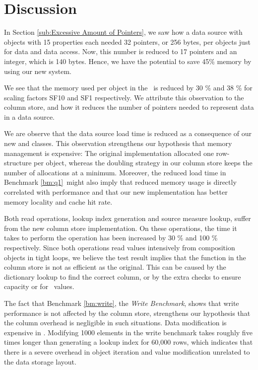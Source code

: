 \section{Discussion}
\label{sec:Discussion}
In Section \ref{sub:Excessive Amount of Pointers}, we saw how a data source with objects with 15 properties each needed 32 pointers, or 256 bytes, per objects just for data and data access. Now, this number is reduced to 17 pointers and an integer, which is 140 bytes. Hence, we have the potential to save 45\% memory by using our new system.

We see that the memory used per object in the \tpchdl~is reduced by 30 \% and 38 \% for scaling factors SF10 and SF1 respectively. We attribute this observation to the column store, and how it reduces the number of pointers needed to represent data in a data source. 

We are observe that the data source load time is reduced as a consequence of our new  and  classes. This observation strengthens our hypothesis that memory management is expensive: The original implementation allocated one row-structure per object, whereas the doubling strategy in our column store keeps the number of allocations at a minimum. Moreover, the reduced load time in Benchmark \ref{bm:q1}~might also imply that reduced memory usage is directly correlated with performance and that our new implementation has better memory locality and cache hit rate.

Both read operations, lookup index generation and source measure lookup, suffer from the new column store implementation. On these operations, the time it takes to perform the operation has been increased by 30 \% and 100 \% respectively. Since both operations read values intensively from composition objects in tight loops, we believe the test result implies that the  function in the column store is not as efficient as the original. This can be caused by the dictionary lookup to find the correct column, or by the extra checks to ensure capacity or for \nil~values.

The fact that Benchmark \ref{bm:write}, the \textit{Write Benchmark}, shows that write performance is not affected by the column store, strengthens our hypothesis that the column overhead is negligible in such situations. Data modification is expensive in \gap. Modifying 1000 elements in the write benchmark takes roughly five times longer than generating a lookup index for 60,000 rows, which indicates that there is a severe overhead in object iteration and value modification unrelated to the data storage layout.

